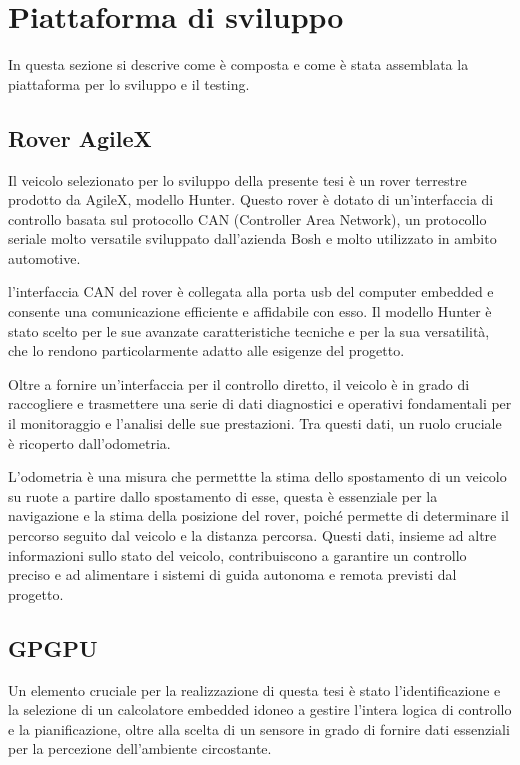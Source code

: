 \section{Piattaforma di sviluppo}
In questa sezione si descrive come è composta e come è stata assemblata la piattaforma per lo sviluppo e il testing.
\subsection{Rover AgileX}
Il veicolo selezionato per lo sviluppo della presente tesi è un rover terrestre prodotto da AgileX, modello Hunter. Questo rover è dotato di un'interfaccia di controllo basata sul protocollo CAN (Controller Area Network), un protocollo seriale molto versatile sviluppato dall'azienda Bosh e molto utilizzato in ambito automotive. 

\noindent l'interfaccia CAN del rover è collegata alla porta usb del computer embedded e consente una comunicazione efficiente e affidabile con esso. Il modello Hunter è stato scelto per le sue avanzate caratteristiche tecniche e per la sua versatilità, che lo rendono particolarmente adatto alle esigenze del progetto.

\noindent Oltre a fornire un'interfaccia per il controllo diretto, il veicolo è in grado di raccogliere e trasmettere una serie di dati diagnostici e operativi fondamentali per il monitoraggio e l'analisi delle sue prestazioni. Tra questi dati, un ruolo cruciale è ricoperto dall'odometria. 

\noindent L'odometria è una misura che permettte la stima dello spostamento di un veicolo su ruote a partire dallo spostamento di esse, questa è essenziale per la navigazione e la stima della posizione del rover, poiché permette di determinare il percorso seguito dal veicolo e la distanza percorsa. Questi dati, insieme ad altre informazioni sullo stato del veicolo, contribuiscono a garantire un controllo preciso e ad alimentare i sistemi di guida autonoma e remota previsti dal progetto.

\subsection{GPGPU}
Un elemento cruciale per la realizzazione di questa tesi è stato l'identificazione e la selezione di un calcolatore embedded idoneo a gestire l'intera logica di controllo e la pianificazione, oltre alla scelta di un sensore in grado di fornire dati essenziali per la percezione dell'ambiente circostante.

